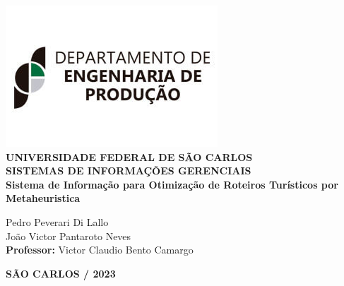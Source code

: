 \justifying %
\onehalfspacing %
\setlength{\parindent}{0cm}  %
\renewcommand*\familydefault{\rmdefault}
\thispagestyle{empty}
\begin{center}
\includegraphics[scale=0.6]{0-Capa/logo-dep.jpg}\\
\vspace*{.8cm}
{\huge \textbf{UNIVERSIDADE FEDERAL DE SÃO CARLOS}}\\
\vspace*{.8cm}
{\Large \textbf{SISTEMAS DE INFORMAÇÕES GERENCIAIS}}\\
\vspace*{3cm}
{\Large \textbf{Sistema de Informação para Otimização de Roteiros Turísticos por Metaheuristica}}\\
\vspace*{4.5cm}
\begin{flushright}
    \onehalfspacing
    {\Large  Pedro Peverari Di Lallo}\\
    {\Large  João Victor Pantaroto Neves}\\
    \vspace*{.3cm}
    {\Large \textbf{Professor:}}
    {\Large Victor Claudio Bento Camargo}\\
\end{flushright}
\vspace*{\fill}
{\large \bf SÃO CARLOS / 2023}
\end{center}